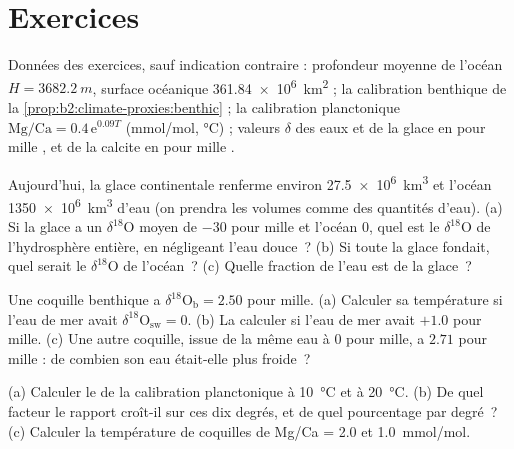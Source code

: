 \section*{Exercices}\label{sec:b2:climate-proxies:exercises}

Données des exercices, sauf indication contraire : profondeur moyenne de l'océan $H = \qty{3682.2}{m}$, surface océanique
\qty{361.84e6}{km^2} ; la calibration benthique de la \cref{prop:b2:climate-proxies:benthic} ; la calibration
planctonique $\text{Mg/Ca} = 0.4\,\mathrm{e}^{0.09T}$ (\unit{mmol/mol}, \unit{\celsius}) ;
valeurs $\delta$ des eaux et de la glace en pour mille , et de la calcite en pour mille .

\begin{exercise}[$\star$]\label{exo:b2:climate-proxies:1}
Aujourd'hui, la glace continentale renferme environ \qty{27.5e6}{km^3} et l'océan \qty{1350e6}{km^3} d'eau
(on prendra les volumes comme des quantités d'eau). (a) Si la glace a un $\delta^{18}$O moyen de $-30$ pour
mille et l'océan 0, quel est le $\delta^{18}$O de l'hydrosphère entière, en négligeant l'eau douce~?
(b) Si toute la glace fondait, quel serait le $\delta^{18}$O de l'océan~? (c) Quelle fraction
de l'eau est de la glace~?
\end{exercise}

\begin{exercise}[$\star$]\label{exo:b2:climate-proxies:2}
Une coquille benthique a $\delta^{18}\mathrm{O}_{\mathrm{b}} = 2.50$ pour mille. (a) Calculer sa
température si l'eau de mer avait $\delta^{18}\mathrm{O}_{\mathrm{sw}} = 0$. (b) La calculer si l'eau de mer avait
$+1.0$ pour mille. (c) Une autre coquille, issue de la même eau à $0$ pour mille, a
$2.71$ pour mille : de combien son eau était-elle plus froide~?
\end{exercise}

\begin{exercise}[$\star$]\label{exo:b2:climate-proxies:3}
(a) Calculer le  de la calibration planctonique à \qty{10}{\celsius} et à
\qty{20}{\celsius}. (b) De quel facteur le rapport croît-il sur ces dix degrés, et de quel
pourcentage par degré~? (c) Calculer la température de coquilles de Mg/Ca = 2.0 et
\qty{1.0}{mmol/mol}.
\end{exercise}

